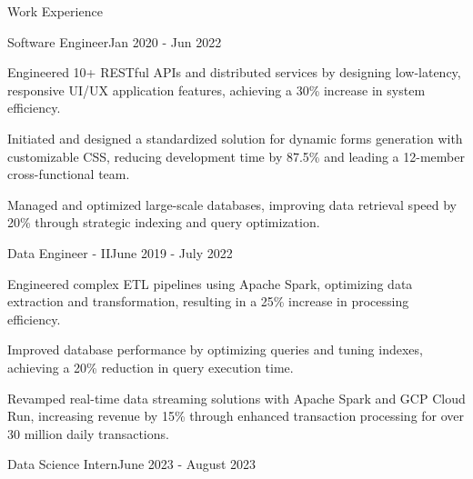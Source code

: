 \documentclass{resume} %
\begin{document}
    \begin{rSection}{Work Experience}
                    \begin{rSubsection}
                {Software Engineer}{Jan 2020 - Jun 2022}
                                    {}
                                {}
                                    \item Engineered 10+ RESTful APIs and distributed services by designing low{-}latency, responsive UI/UX application features, achieving a 30\% increase in system efficiency.
                                    \item Initiated and designed a standardized solution for dynamic forms generation with customizable CSS, reducing development time by 87.5\% and leading a 12{-}member cross{-}functional team.
                                    \item Managed and optimized large{-}scale databases, improving data retrieval speed by 20\% through strategic indexing and query optimization.
                            \end{rSubsection}
                    \begin{rSubsection}
                {Data Engineer {-} II}{June 2019 - July 2022}
                                    {}
                                {}
                                    \item Engineered complex ETL pipelines using Apache Spark, optimizing data extraction and transformation, resulting in a 25\% increase in processing efficiency.
                                    \item Improved database performance by optimizing queries and tuning indexes, achieving a 20\% reduction in query execution time.
                                    \item Revamped real{-}time data streaming solutions with Apache Spark and GCP Cloud Run, increasing revenue by 15\% through enhanced transaction processing for over 30 million daily transactions.
                            \end{rSubsection}
                    \begin{rSubsection}
                {Data Science Intern}{June 2023 - August 2023}
                                    {}
                                {}

\end{rSubsection}
\end{rSection}
\end{document}
